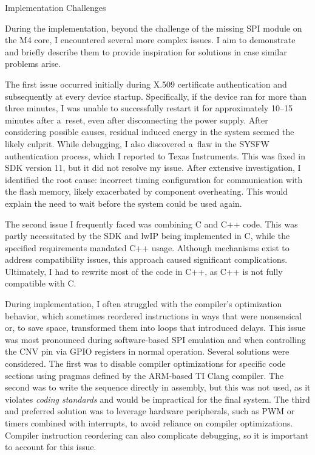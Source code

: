 \sec Implementation Challenges

During the implementation, beyond the challenge of the missing SPI module on the M4 core, I encountered several more complex issues. I aim to demonstrate and briefly describe them to provide inspiration for solutions in case similar problems arise.

The first issue occurred initially during X.509 certificate authentication and subsequently at every device startup. Specifically, if the device ran for more than three minutes, I was unable to successfully restart it for approximately 10–15 minutes after a~reset, even after disconnecting the power supply. After considering possible causes, residual induced energy in the system seemed the likely culprit. While debugging, I also discovered a~flaw in the SYSFW authentication process, which I reported to Texas Instruments. This was fixed in SDK version 11, but it did not resolve my issue. After extensive investigation, I identified the root cause: incorrect timing configuration for communication with the flash memory, likely exacerbated by component overheating. This would explain the need to wait before the system could be used again.

The second issue I frequently faced was combining C and C++ code. This was partly necessitated by the SDK and lwIP being implemented in C, while the specified requirements mandated C++ usage. Although mechanisms exist to address compatibility issues, this approach caused significant complications. Ultimately, I had to rewrite most of the code in C++, as C++ is not fully compatible with C.

During implementation, I often struggled with the compiler’s optimization behavior, which sometimes reordered instructions in ways that were nonsensical or, to save space, transformed them into loops that introduced delays. This issue was most pronounced during software-based SPI emulation and when controlling the CNV pin via GPIO registers in normal operation. Several solutions were considered. The first was to disable compiler optimizations for specific code sections using pragmas defined by the ARM-based TI Clang compiler. The second was to write the sequence directly in assembly, but this was not used, as it violates {\it coding standards} and would be impractical for the final system. The third and preferred solution was to leverage hardware peripherals, such as PWM or timers combined with interrupts, to avoid reliance on compiler optimizations. Compiler instruction reordering can also complicate debugging, so it is important to account for this issue.

